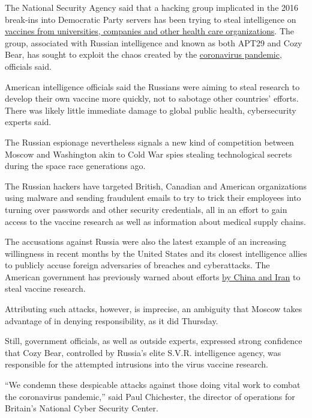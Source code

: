 The National Security Agency said that a hacking group implicated in the
2016 break-ins into Democratic Party servers has been trying to steal
intelligence on
\href{https://www.nytimes.com/interactive/2020/science/coronavirus-vaccine-tracker.html}{vaccines
from universities, companies and other health care organizations}. The
group, associated with Russian intelligence and known as both APT29 and
Cozy Bear, has sought to exploit the chaos created by the
\href{https://www.nytimes.com/news-event/coronavirus}{coronavirus
pandemic}, officials said.

American intelligence officials said the Russians were aiming to steal
research to develop their own vaccine more quickly, not to sabotage
other countries' efforts. There was likely little immediate damage to
global public health, cybersecurity experts said.

The Russian espionage nevertheless signals a new kind of competition
between Moscow and Washington akin to Cold War spies stealing
technological secrets during the space race generations ago.

The Russian hackers have targeted British, Canadian and American
organizations using malware and sending fraudulent emails to try to
trick their employees into turning over passwords and other security
credentials, all in an effort to gain access to the vaccine research as
well as information about medical supply chains.

The accusations against Russia were also the latest example of an
increasing willingness in recent months by the United States and its
closest intelligence allies to publicly accuse foreign adversaries of
breaches and cyberattacks. The American government has previously warned
about efforts
\href{https://www.nytimes.com/2020/05/10/us/politics/coronavirus-china-cyber-hacking.html}{by
China and Iran} to steal vaccine research.

Attributing such attacks, however, is imprecise, an ambiguity that
Moscow takes advantage of in denying responsibility, as it did Thursday.

Still, government officials, as well as outside experts, expressed
strong confidence that Cozy Bear, controlled by Russia's elite S.V.R.
intelligence agency, was responsible for the attempted intrusions into
the virus vaccine research.

``We condemn these despicable attacks against those doing vital work to
combat the coronavirus pandemic,'' said Paul Chichester, the director of
operations for Britain's National Cyber Security Center.

